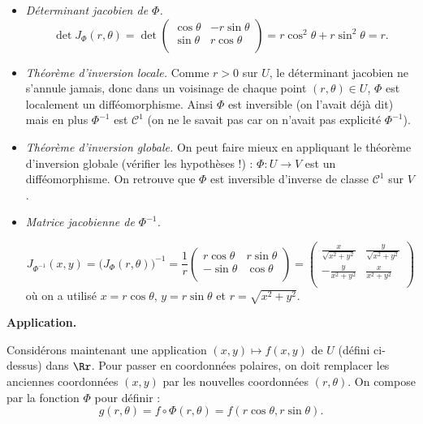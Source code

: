 \documentclass[11pt, class=report,crop=false]{standalone}
\begin{document}
\begin{itemize}
    
\item \emph{Déterminant jacobien de $\Phi$.}   
$$\det J_\Phi(r,\theta) = \det \begin{pmatrix}
\cos \theta &-r\sin \theta \\
\sin \theta &r\cos \theta \\
\end{pmatrix}
= r\cos^2\theta + r\sin^2\theta = r.$$

    
\item \emph{Théorème d'inversion locale.} 
  Comme $r>0$ sur $U$, le déterminant jacobien ne s'annule jamais, donc dans un voisinage de chaque point $(r,\theta) \in U$, $\Phi$ est localement un difféomorphisme. Ainsi  $\Phi$ est inversible (on l'avait déjà dit) mais en plus $\Phi^{-1}$ est $\mathcal{C}^1$ (on ne le savait pas car on n'avait pas explicité $\Phi^{-1}$).
  


\item \emph{Théorème d'inversion globale.}
  On peut faire mieux en appliquant le théorème d'inversion globale (vérifier les hypothèses !) : $\Phi : U \to V$ est un difféomorphisme. On retrouve que $\Phi$ est inversible d'inverse de classe $\mathcal{C}^1$ sur $V$.
  
  
\item \emph{Matrice jacobienne de $\Phi^{-1}$.}

$$J_{\Phi^{-1}}(x,y) = \big( J_\Phi(r,\theta) \big)^{-1}
= 
\frac1r
\begin{pmatrix}
r\cos \theta &r\sin \theta \\
-\sin \theta &\cos \theta \\
\end{pmatrix}
= 
\begin{pmatrix}
\frac{x}{\sqrt{x^2+y^2}} & \frac{y}{\sqrt{x^2+y^2}} \\
-\frac{y}{x^2+y^2} & \frac{x}{x^2+y^2} \\
\end{pmatrix} 
$$
où on a utilisé $x=r\cos\theta$, $y=r\sin\theta$ et $r=\sqrt{x^2+y^2}$. 

\end{itemize}  
  
  \bigskip
  
\textbf{Application.}


Considérons maintenant une application $(x, y)\mapsto f(x,y)$ de $U$ (défini ci-dessus) dans $\Rr$. 
Pour \og{}passer en coordonnées polaires\fg{}, on doit remplacer les anciennes coordonnées $(x,y)$ par les nouvelles coordonnées $(r,\theta)$. 
On compose par la fonction $\Phi$ pour définir :
$$g(r,\theta)=f \circ \Phi (r,\theta)=f\left(r\cos\theta,r\sin\theta\right).$$
\end{document}

